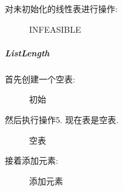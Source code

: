 \documentclass[supercite]{Experimental_Report}
\theoremstyle{definition}
\begin{document}
\noindent
对未初始化的线性表进行操作:
\begin{figure}[htbp]
	\centering
	\centering
	\caption{INFEASIBLE}
	\label{fig1-14}
\end{figure}

\clearpage
\subparagraph{ListLength}
\noindent
首先创建一个空表:
\begin{figure}[htbp]
	\centering
	\centering
	\caption{初始}
	\label{fig1-15}
\end{figure}

\noindent
然后执行操作5. 现在表是空表.
\begin{figure}[htbp]
	\centering
	\centering
	\caption{空表}
	\label{fig1-16}
\end{figure}

\noindent
接着添加元素:
\begin{figure}[htbp]
	\centering
	\centering
	\caption{添加元素}
	\label{fig1-17}
\end{figure}
\end{document}
